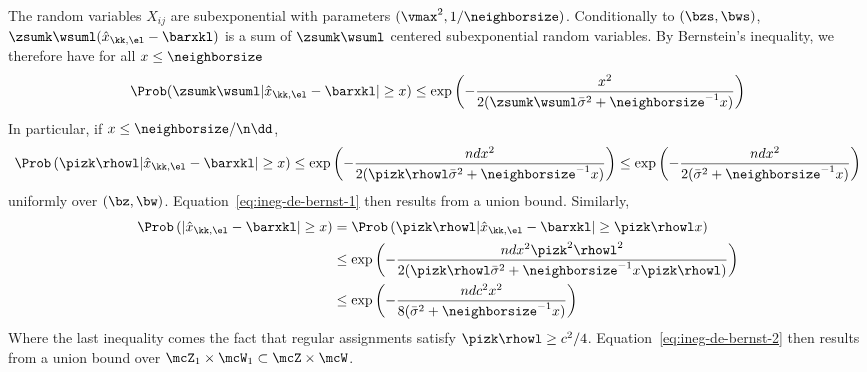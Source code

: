 \proofbegin

The random variables $X_{ij}$ are subexponential with parameters $(\vmax^2, 1/\neighborsize)$. Conditionally to $(\bzs, \bws)$, $\zsumk \wsuml(\hat{x}_{\kk, \el} - \barxkl)$ is a sum of $\zsumk \wsuml$ centered subexponential random variables. By Bernstein's inequality, we therefore have for all $x \leq \neighborsize$
\begin{align*}
\Prob( \zsumk \wsuml | \hat{x}_{\kk, \el} - \barxkl| \geq x ) & \leq \exp\left( - \frac{x^2}{2(\zsumk \wsuml\bar{\sigma}^2 + \neighborsize^{-1} x)}\right) \\
\end{align*}
In particular, if $x \leq \neighborsize / \n\dd$,
\begin{align*}
\Prob\left( \pizk \rhowl | \hat{x}_{\kk, \el} - \barxkl| \geq x \right) & \leq \exp\left( - \frac{ndx^2}{2(\pizk\rhowl\bar{\sigma}^2 + \neighborsize^{-1} x)}\right) \leq \exp\left( - \frac{ndx^2}{2(\bar{\sigma}^2 + \neighborsize^{-1} x )}\right) \\
\end{align*}
uniformly over $(\bz, \bw)$. Equation~\eqref{eq:ineg-de-bernst-1} then results from a union bound.
Similarly,
\begin{align*}
  \Prob\left( | \hat{x}_{\kk, \el} - \barxkl| \geq x \right) & = \Prob\left( \pizk \rhowl | \hat{x}_{\kk, \el} - \barxkl| \geq \pizk \rhowl x \right) \\
  & \leq \exp\left( - \frac{ndx^2\pizk^2\rhowl^2}{2(\pizk\rhowl\bar{\sigma}^2 + \neighborsize^{-1} x \pizk\rhowl)}\right) \\
  & \leq \exp\left( - \frac{ndc^2x^2}{8(\bar{\sigma}^2 + \neighborsize^{-1} x )}\right)
\end{align*}
Where the last inequality comes the fact that regular assignments satisfy $\pizk \rhowl \geq c^2/4$. Equation~\eqref{eq:ineg-de-bernst-2} then results from a union bound over $\mcZ_1 \times \mcW_1 \subset \mcZ \times \mcW$.
\proofend

